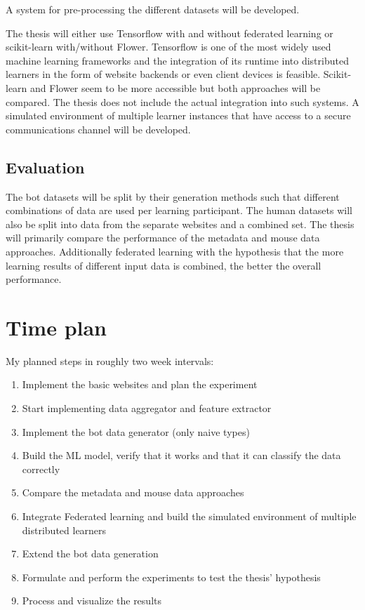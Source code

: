 \documentclass[
    fontsize=12pt,
    headings=small,
    parskip=half,           %
    bibliography=totoc,
    numbers=noenddot,       %
    open=any,               %
    final                   %
    ]{scrreprt}
\begin{document}
A system for pre-processing the different datasets will be developed.

The thesis will either use Tensorflow with and without federated learning or scikit-learn with/without Flower.
Tensorflow is one of the most widely used machine learning frameworks and the integration of its runtime into distributed learners in the form of website backends or even client devices is feasible. Scikit-learn and Flower seem to be more accessible but both approaches will be compared. The thesis does not include the actual integration into such systems. A simulated environment of multiple learner instances that have access to a secure communications channel will be developed.

\section{Evaluation}

The bot datasets will be split by their generation methods such that different combinations of data are used per learning participant. The human datasets will also be split into data from the separate websites and a combined set.
The thesis will primarily compare the performance of the metadata and mouse data approaches. Additionally federated learning with the hypothesis that the more learning results of different input data is combined, the better the overall performance.

\chapter{Time plan}

My planned steps in roughly two week intervals: \\

\begin{enumerate}
	\item Implement the basic websites and plan the experiment
	\item Start implementing data aggregator and feature extractor
	\item Implement the bot data generator (only naive types)
	\item Build the ML model, verify that it works and that it can classify the data correctly
	\item Compare the metadata and mouse data approaches
	\item Integrate Federated learning and build the simulated environment of multiple distributed learners
	\item Extend the bot data generation
	\item Formulate and perform the experiments to test the thesis' hypothesis
	\item Process and visualize the results
\end{enumerate}


\begin{raggedright}
  \printbibliography
\end{raggedright}
\end{document}
